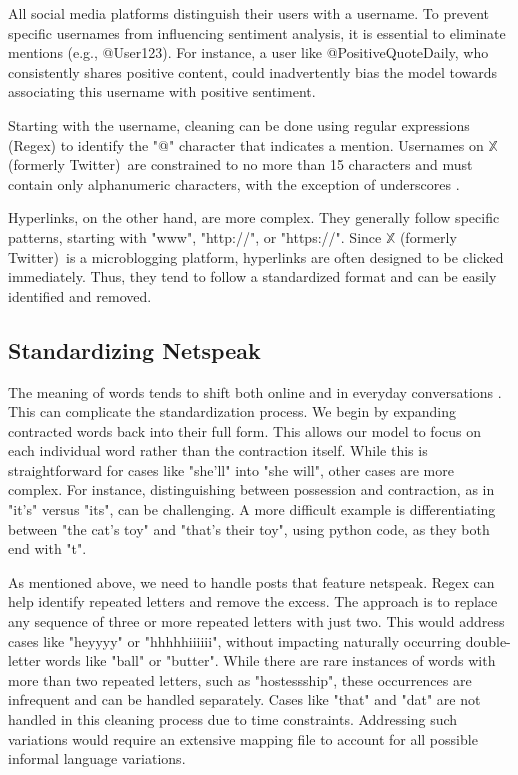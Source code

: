 \documentclass{article}
\newcommand{\twitter}{$\mathbb{X}$ (formerly Twitter)}
\begin{document}
\begin{multicols}{2}
All social media platforms distinguish their users with a username. To prevent specific usernames from influencing sentiment analysis, it is essential to eliminate mentions (e.g., @User123). For instance, a user like @PositiveQuoteDaily, who consistently shares positive content, could inadvertently bias the model towards associating this username with positive sentiment. 

Starting with the username, cleaning can be done using regular expressions (Regex) to identify the "@" character that indicates a mention. Usernames on \twitter\ are constrained to no more than 15 characters and must contain only alphanumeric characters, with the exception of underscores \cite{XUsernameRules}. 

Hyperlinks, on the other hand, are more complex. They generally follow specific patterns, starting with "www", "http://", or "https://". Since \twitter\ is a microblogging platform, hyperlinks are often designed to be clicked immediately. Thus, they tend to follow a standardized format and can be easily identified and removed. 

\subsection{Standardizing Netspeak}   

The meaning of words tends to shift both online \cite{LeriqueRoth2018} and in everyday conversations \cite{Liberman2012}. This can complicate the standardization process. We begin by expanding contracted words back into their full form. This allows our model to focus on each individual word rather than the contraction itself. While this is straightforward for cases like "she'll" into "she will", other cases are more complex. For instance, distinguishing between possession and contraction, as in "it's" versus "its", can be challenging. A more difficult example is differentiating between "the cat's toy" and "that's their toy", using python code, as they both end with "t".

As mentioned above, we need to handle posts that feature netspeak. Regex can help identify repeated letters and remove the excess. The approach is to replace any sequence of three or more repeated letters with just two. This would address cases like "heyyyy" or "hhhhhiiiiii", without impacting naturally occurring double-letter words like "ball" or "butter". While there are rare instances of words with more than two repeated letters, such as "hostessship", these occurrences are infrequent and can be handled separately. Cases like "that" and "dat" are not handled in this cleaning process due to time constraints. Addressing such variations would require an extensive mapping file to account for all possible informal language variations. 


\end{multicols}
\end{document}
